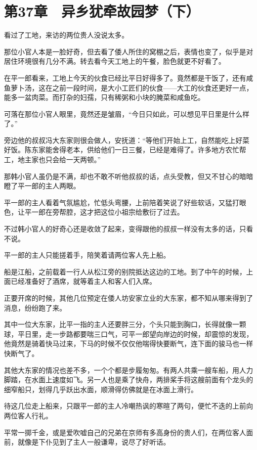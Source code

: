 \section{第37章　异乡犹牵故园梦（下）}

看过了工地，来访的两位贵人没说太多。

那位小官人本是一脸好奇，但去看了倭人所住的窝棚之后，表情也变了，似乎是对居住环境很有几分不满。转去看今天工地上的午餐，脸色就更不好看了。

在平一郎看来，工地上今天的伙食已经比平日好得多了。竟然都是干饭了，还有咸鱼萝卜汤，这在之前一段时间，是大小工匠们的伙食——大工的伙食还更好一点，能多一盆肉菜。而打杂的妇孺，只有稀粥和小块的腌菜和咸鱼吃。

可落在那位小官人眼里，竟然还是皱眉，“今日只如此，可以想见平日里是什么样了。”

旁边他的叔叔冯大东家则很会做人，安抚道：“等他们开始上工，自然能吃上好菜好饭。陈东家能舍得老本，供给他们一日三餐，已经是难得了。许多地方农忙帮工，地主家也只会给一天两顿。”

那韩小官人虽仍是不满，却也不敢不听他叔叔的话，点头受教，但又不甘心的暗暗瞪了平一郎的主人两眼。

平一郎的主人看着气氛尴尬，忙低头弯腰，上前陪着笑说了好些软话，又猛打眼色，让平一郎在旁帮腔，这才把这位小祖宗给敷衍了过去。

不过韩小官人的好奇心还是收敛了起来，变得跟他的叔叔一样没有太多的话，只看不说。

平一郎的主人只能搓着手，陪笑着请两位客人先上船。

船是江船，之前载着一行人从松江旁的别院抵达这边的工地。到了中午的时候，上面已经准备好了酒席，就等着主人和客人们入席。

正要开席的时候，其他几位预定在倭人坊安家立业的大东家，都不知从哪来得到了消息，纷纷跑了来。

其中一位大东家，比平一指的主人还要胖三分，个头只能到胸口，长得就像一颗球，平日里，走一步路都要喘三口气，可平一郎望向岸边的时候，却震惊的发现，他竟然是骑着快马过来，下马的时候不仅仅他喘得快要断气，连下面的骏马也一样快断气了。

其他大东家的情况也差不多，一个个都是步履匆匆。有两人共乘一艘车船，用人力脚踏，在水面上速度如飞。另一人也是乘了快舟，两排桨手将这艘前面有个龙头的细窄船只，划得几乎跃出水面，顺滑得仿佛就是在冰面上滑行。

待这几位走上船来，只跟平一郎的主人冷嘲热讽的寒暄了两句，便忙不迭的上前向两位客人行礼。

平常一掷千金，或是爱吹嘘自己的兄弟在京师有多高身份的贵人们，在两位客人面前，就像是下仆见到了主人一般谦卑，说尽了好听话。

